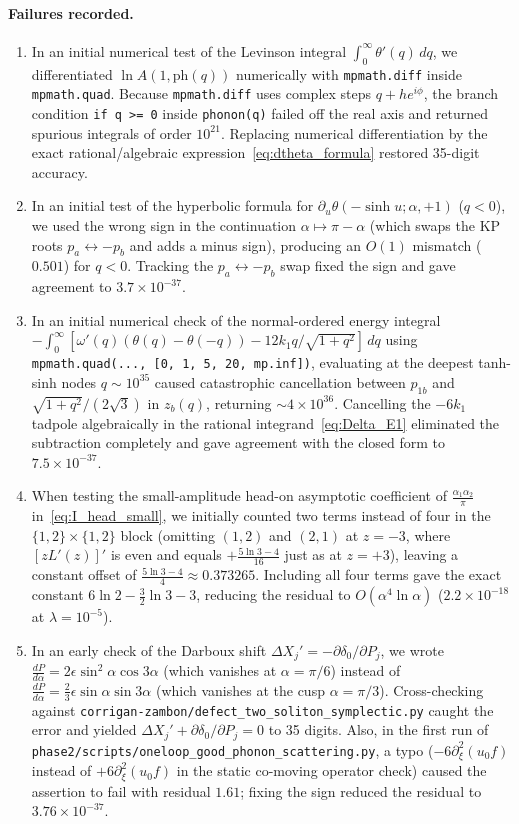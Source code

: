 \documentclass[11pt,a4paper]{article}
\newcommand{\script}[1]{\texttt{phase2/\allowbreak scripts/\allowbreak #1}}
\theoremstyle{remark}
\begin{document}
\paragraph{Failures recorded.}
\begin{enumerate}
\item In an initial numerical test of the Levinson integral $\int_0^\infty\theta'(q)\,dq$, we differentiated $\ln A(1,\mathrm{ph}(q))$ numerically with \texttt{mpmath.diff} inside \texttt{mpmath.quad}. Because \texttt{mpmath.diff} uses complex steps $q+he^{i\phi}$, the branch condition \texttt{if q >= 0} inside \texttt{phonon(q)} failed off the real axis and returned spurious integrals of order $10^{21}$. Replacing numerical differentiation by the exact rational/algebraic expression~\eqref{eq:dtheta_formula} restored 35-digit accuracy.
\item In an initial test of the hyperbolic formula for $\partial_u\theta(-\sinh u;\alpha,+1)$ ($q<0$), we used the wrong sign in the continuation $\alpha\mapsto\pi-\alpha$ (which swaps the KP roots $p_a\leftrightarrow -p_b$ and adds a minus sign), producing an $O(1)$ mismatch ($0.501$) for $q<0$. Tracking the $p_a\leftrightarrow -p_b$ swap fixed the sign and gave agreement to $3.7\times 10^{-37}$.
\item In an initial numerical check of the normal-ordered energy integral $-\int_0^\infty[\omega'(q)(\theta(q)-\theta(-q))-12k_1 q/\sqrt{1+q^2}]\,dq$ using \texttt{mpmath.quad(..., [0, 1, 5, 20, mp.inf])}, evaluating at the deepest tanh-sinh nodes $q\sim 10^{35}$ caused catastrophic cancellation between $p_{1b}$ and $\sqrt{1+q^2}/(2\sqrt{3})$ in $z_b(q)$, returning $\sim 4\times 10^{36}$. Cancelling the $-6k_1$ tadpole algebraically in the rational integrand~\eqref{eq:Delta_E1} eliminated the subtraction completely and gave agreement with the closed form to $7.5\times 10^{-37}$.
\item When testing the small-amplitude head-on asymptotic coefficient of $\frac{\alpha_1\alpha_2}{\pi}$ in~\eqref{eq:I_head_small}, we initially counted two terms instead of four in the $\{1,2\}\times\{1,2\}$ block (omitting $(1,2)$ and $(2,1)$ at $z=-3$, where $[zL'(z)]'$ is even and equals $+\frac{5\ln 3-4}{16}$ just as at $z=+3$), leaving a constant offset of $\frac{5\ln 3-4}{4}\approx 0.373265$. Including all four terms gave the exact constant $6\ln 2-\frac{3}{2}\ln 3-3$, reducing the residual to $O(\alpha^4\ln\alpha)$ ($2.2\times 10^{-18}$ at $\lambda=10^{-5}$).
\item In an early check of the Darboux shift $\Delta X_j'=-\partial\delta_0/\partial P_j$, we wrote $\frac{dP}{d\alpha}=2\epsilon\sin^2\alpha\cos 3\alpha$ (which vanishes at $\alpha=\pi/6$) instead of $\frac{dP}{d\alpha}=\frac{2}{3}\epsilon\sin\alpha\sin 3\alpha$ (which vanishes at the cusp $\alpha=\pi/3$). Cross-checking against \texttt{corrigan-zambon/defect\_two\_soliton\_symplectic.py} caught the error and yielded $\Delta X_j'+\partial\delta_0/\partial P_j=0$ to 35 digits. Also, in the first run of \script{oneloop\_good\_phonon\_scattering.py}, a typo ($-6\partial_\xi^2(u_0 f)$ instead of $+6\partial_\xi^2(u_0 f)$ in the static co-moving operator check) caused the assertion to fail with residual $1.61$; fixing the sign reduced the residual to $3.76\times 10^{-37}$.

\end{enumerate}
\end{document}
